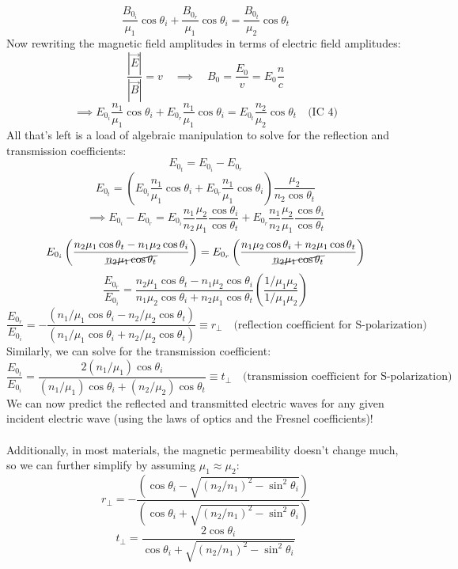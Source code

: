 \documentclass[12pt]{article}
\begin{document}
\[
\frac{B_{0_i}}{\mu_1} \cos\theta_i + \frac{B_{0_r}}{\mu_1} \cos\theta_i = \frac{B_{0_t}}{\mu_2} \cos\theta_t
\]
Now rewriting the magnetic field amplitudes in terms of electric field amplitudes:
\[\frac{|\vec{E}|}{|\vec{B}|} = v \quad\implies \quad B_0 = \frac{E_0}{v} = E_0\frac{n}{c}\]
\[\implies \boxed{E_{0_i} \frac{n_1}{\mu_1} \cos\theta_i + E_{0_r} \frac{n_1}{\mu_1} \cos\theta_i = E_{0_t} \frac{n_2}{\mu_2} \cos\theta_t \quad \text{(IC 4)}}\]
\newpage\noindent
All that's left is a load of algebraic manipulation to solve for the reflection and transmission coefficients:
\[E_{0_t} = E_{0_i} - E_{0_r}\]
\[E_{0_t} = \left( E_{0_i} \frac{n_1}{\mu_1} \cos\theta_i + E_{0_r} \frac{n_1}{\mu_1} \cos\theta_i \right) \frac{\mu_2}{n_2 \cos\theta_t}\]
\[\implies E_{0_i} - E_{0_r} = E_{0_i} \frac{n_1}{n_2} \frac{\mu_2}{\mu_1} \frac{\cos\theta_i}{\cos\theta_t} + E_{0_r} \frac{n_1}{n_2} \frac{\mu_2}{\mu_1} \frac{\cos\theta_i}{\cos\theta_t}
\]
\[E_{0_i} \left( \frac{n_2 \mu_1 \cos\theta_t - n_1 \mu_2 \cos\theta_i}{\cancel{n_2 \mu_1 \cos\theta_t}} \right) = E_{0_r} \left( \frac{n_1 \mu_2 \cos\theta_i + n_2 \mu_1 \cos\theta_t}{\cancel{n_2 \mu_1 \cos\theta_t}} \right)\]
\[\frac{E_{0_r}}{E_{0_i}} = \frac{n_2 \mu_1 \cos\theta_t - n_1 \mu_2 \cos\theta_i}{n_1 \mu_2 \cos\theta_i + n_2 \mu_1 \cos\theta_t} \left( \frac{1/\mu_1 \mu_2}{1/\mu_1 \mu_2} \right)
\]
\[\boxed{\frac{E_{0_r}}{E_{0_i}} = -\frac{(n_1/\mu_1 \cos\theta_i - n_2/\mu_2 \cos\theta_t)}{(n_1/\mu_1 \cos\theta_i + n_2/\mu_2 \cos\theta_t)} \equiv r_{\perp} \quad \text{(reflection coefficient for S-polarization)}}\]
Similarly, we can solve for the transmission coefficient:
\[\boxed{\frac{E_{0_t}}{E_{0_i}} = \frac{2(n_1/\mu_1) \cos\theta_i}{(n_1/\mu_1) \cos\theta_i + (n_2/\mu_2) \cos\theta_t} \equiv t_{\perp} \quad \text{(transmission coefficient for S-polarization)}}\]
We can now predict the reflected and transmitted electric waves for any given incident electric wave (using the laws of optics and the Fresnel coefficients)!\\\\
Additionally, in most materials, the magnetic permeability doesn't change much, so we can further simplify by assuming $\mu_1 \approx \mu_2$:
\[
\boxed{r_{\perp} = -\frac{\left(\cos\theta_i - \sqrt{(n_2/n_1)^2 - \sin^2\theta_i}\right)}{\left(\cos\theta_i + \sqrt{(n_2/n_1)^2 - \sin^2\theta_i}\right)}}
\]
\[
\boxed{t_{\perp} = \frac{2\cos\theta_i}{\cos\theta_i + \sqrt{(n_2/n_1)^2 - \sin^2\theta_i}}}
\]
\end{document}
